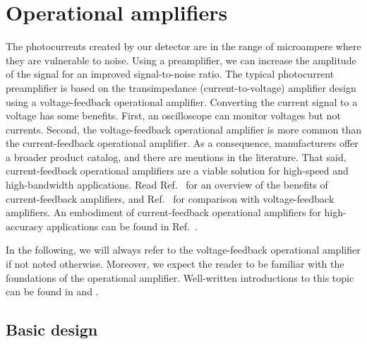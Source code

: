 \section{Operational amplifiers}

The photocurrents created by our detector are in the range of microampere where they are vulnerable to noise.
Using a preamplifier, we can increase the amplitude of the signal for an improved signal-to-noise ratio.
The typical photocurrent preamplifier is based on the transimpedance (current-to-voltage) amplifier design using a voltage-feedback operational amplifier.
Converting the current signal to a voltage has some benefits. First, an oscilloscope can monitor voltages but not currents.
Second, the voltage-feedback operational amplifier is more common than the current-feedback operational amplifier. As a consequence, manufacturers offer a broader product catalog, and there are mentions in the literature.
That said, current-feedback operational amplifiers are a viable solution for high-speed and high-bandwidth applications. Read Ref.~\cite[p.~110]{Jung05} for an overview of the benefits of current-feedback amplifiers, and Ref.~\cite[Ch.~9]{Carter17} for comparison with voltage-feedback amplifiers.
An embodiment of current-feedback operational amplifiers for high-accuracy applications can be found in Ref.~\cite[p.~143]{Noorlag74}.

In the following, we will always refer to the voltage-feedback operational amplifier if not noted otherwise.
Moreover, we expect the reader to be familiar with the foundations of the operational amplifier.
Well-written introductions to this topic can be found in \cite[Ch.~1]{Jung05} and \cite[Ch.~3]{Carter17}.

\subsection{Basic design}

